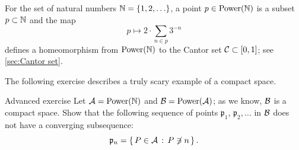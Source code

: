 For the set of natural numbers $\mathbb{N}=\{1,2,\ldots\}$, a point $p\in \mathrm{Power}(\mathbb{N})$ is a subset $p\subset \mathbb{N}$ and the map
\[p\mapsto 2\cdot \sum_{n\in p}3^{-n}\]
defines a homeomorphism from $\mathrm{Power}(\mathbb{N})$ to the Cantor set $\mathcal{C}\subset [0,1]$; see \ref{sec:Cantor set}.


The following exercise describes a truly scary example of a compact space.

\begin{thm}{Advanced exercise}\label{ex:power-power}
Let $\mathcal{A}=\mathrm{Power}(\mathbb{N})$ and $\mathcal{B}=\mathrm{Power}(\mathcal{A})$; as we know, $\mathcal{B}$ is a compact space.
Show that the following sequence of points $\mathfrak{p}_1$, $\mathfrak{p}_2,\ldots$ in $\mathcal{B}$ does not have a converging subsequence:
\[\mathfrak{p}_n=\left\{\,{P\in\mathcal{A}}\,:\,{P\not\ni n}\,\right\}.\]

\end{thm}






